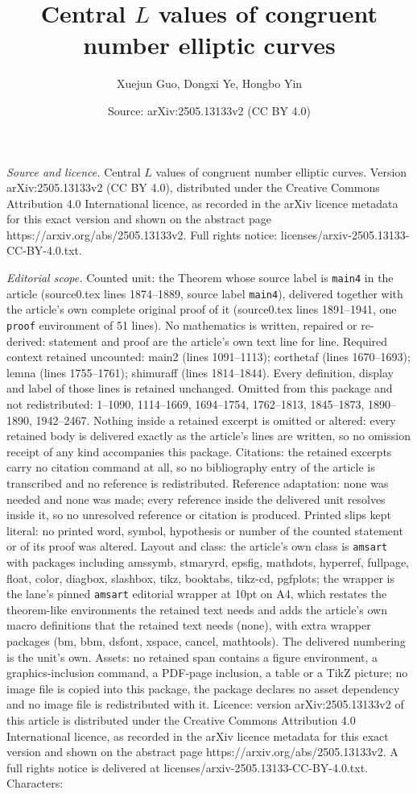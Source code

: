 \documentclass[10pt,a4paper]{amsart}
\title[Central $L$ values of congruent number elliptic curves]{Central $L$ values of congruent number elliptic curves}
\author{Xuejun Guo, Dongxi Ye, Hongbo Yin}
\date{Source: arXiv:2505.13133v2 (CC BY 4.0)}
\begin{document}
\maketitle

\noindent\emph{Source and licence.} Central $L$ values of congruent number elliptic curves. Version arXiv:2505.13133v2 (CC BY 4.0), distributed under the Creative Commons Attribution 4.0 International licence, as recorded in the arXiv licence metadata for this exact version and shown on the abstract page https://arxiv.org/abs/2505.13133v2. Full rights notice: licenses/arxiv-2505.13133-CC-BY-4.0.txt.\par\smallskip

\noindent\textit{Editorial scope.} Counted unit: the Theorem whose source label is \texttt{main4} in the article (source0.tex lines 1874--1889, source label \texttt{main4}), delivered together with the article's own complete original proof of it (source0.tex lines 1891--1941, one \texttt{proof} environment of 51 lines). No mathematics is written, repaired or re-derived: statement and proof are the article's own text line for line. Required context retained uncounted: main2 (lines 1091--1113); corthetaf (lines 1670--1693); lemna (lines 1755--1761); shimuraff (lines 1814--1844). Every definition, display and label of those lines is retained unchanged. Omitted from this package and not redistributed: 1--1090, 1114--1669, 1694--1754, 1762--1813, 1845--1873, 1890--1890, 1942--2467. Nothing inside a retained excerpt is omitted or altered: every retained body is delivered exactly as the article's lines are written, so no omission receipt of any kind accompanies this package. Citations: the retained excerpts carry no citation command at all, so no bibliography entry of the article is transcribed and no reference is redistributed. Reference adaptation: none was needed and none was made; every reference inside the delivered unit resolves inside it, so no unresolved reference or citation is produced. Printed slips kept literal: no printed word, symbol, hypothesis or number of the counted statement or of its proof was altered. Layout and class: the article's own class is \texttt{amsart} with packages including amssymb, stmaryrd, epsfig, mathdots, hyperref, fullpage, float, color, diagbox, slashbox, tikz, booktabs, tikz-cd, pgfplots; the wrapper is the lane's pinned \texttt{amsart} editorial wrapper at 10pt on A4, which restates the theorem-like environments the retained text needs and adds the article's own macro definitions that the retained text needs (none), with extra wrapper packages (bm, bbm, dsfont, xspace, cancel, mathtools). The delivered numbering is the unit's own. Assets: no retained span contains a figure environment, a graphics-inclusion command, a PDF-page inclusion, a table or a TikZ picture; no image file is copied into this package, the package declares no asset dependency and no image file is redistributed with it. Licence: version arXiv:2505.13133v2 of this article is distributed under the Creative Commons Attribution 4.0 International licence, as recorded in the arXiv licence metadata for this exact version and shown on the abstract page https://arxiv.org/abs/2505.13133v2. A full rights notice is delivered at licenses/arxiv-2505.13133-CC-BY-4.0.txt. Characters: 
\end{document}
